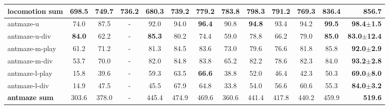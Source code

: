 \begin{table}[h!]
{\begin{tabular}{lccccccccccc|r}
\midrule
\textbf{locomotion sum} & 698.5 & 749.7 & 736.2 & 680.3 & 739.2 & 779.2 & 783.8 & 798.3 & 791.2 & 769.3 & 836.4 & \textbf{856.7}\\ 
\midrule
\midrule
antmaze-u & 74.0 & 87.5 & - & 92.0 & 94.0 & \textbf{96.4} & 90.8 & \textbf{94.8} & 93.4 & 94.2 & \textbf{99.5} & \textbf{98.4$\pm$1.5} \\ 
antmaze-u-div & \textbf{84.0} & 62.2 & - & \textbf{85.3} & 80.2 & 74.4 & 59.0 & 78.8 & 66.2 & 79.0 & \textbf{85.0} & \textbf{83.0$\pm$12.4}\\ 
antmaze-m-play & 61.2 & 71.2 & - & 81.3 & 84.5 & 83.6 & 73.0 & 79.6 & 
76.6 & 81.8 & 85.8 & \textbf{92.0$\pm$2.9}\\ 
antmaze-m-div & 53.7 & 70.0 & - & 82.0 & 84.8 & 83.8 & 65.2 & 82.2 & 78.6 & 
82.3 & 84.0 & \textbf{93.2$\pm$2.8}\\ 
antmaze-l-play & 15.8 & 39.6 & - & 59.3 & 63.5 & \textbf{66.6} & 38.8 & 52.0 & 46.4 & 42.3 & 50.3 & \textbf{69.0$\pm$8.0}\\ 
antmaze-l-div & 14.9 & 47.5 & - & 45.5 & 67.9 & 64.8 & 33.8 & 54.0 & 56.6 & 60.6 & 55.3 & \textbf{84.0$\pm$3.2}\\ 
\midrule
\textbf{antmaze sum} & 303.6 & 378.0 & - & 445.4 & 474.9  & 469.6 & 360.6 & 441.4 & 417.8 & 440.2 & 459.9 & \textbf{519.6}\\ 
\bottomrule
\end{tabular}
}
\end{table}
